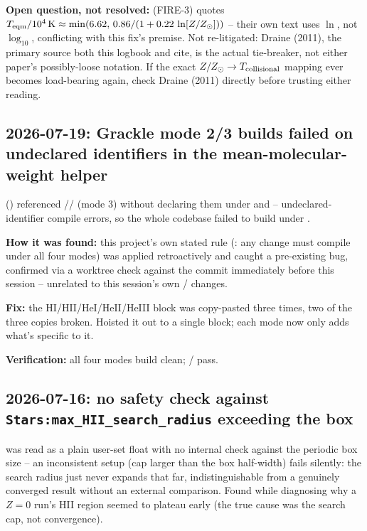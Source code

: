 \textbf{Open question, not resolved:} \citet{Hopkins2023} (FIRE-3)
quotes $T_{\rm eqm}/10^4\,{\rm K}\approx\min(6.62,\,
0.86/(1+0.22\,\ln[Z/Z_\odot]))$ -- their own text uses $\ln$, not
$\log_{10}$, conflicting with this fix's premise. Not re-litigated:
Draine (2011), the primary source both this logbook and
\citet{Hopkins2023} cite, is the actual tie-breaker, not either paper's
possibly-loose notation. If the exact $Z/Z_\odot\to T_{\rm collisional}$
mapping ever becomes load-bearing again, check Draine (2011) directly
before trusting either reading.

\subsection{2026-07-19: Grackle mode 2/3 builds failed on undeclared
identifiers in the mean-molecular-weight helper}
\label{sec:t15-grackle-modes}

 ()
referenced // (mode 3) without
declaring them under  and  -- undeclared-identifier compile errors, so the whole codebase
failed to build under .

\textbf{How it was found:} this project's own stated rule (:
any  change must compile under all four
modes) was applied retroactively and caught a pre-existing bug,
confirmed via a worktree check against the commit immediately before
this session -- unrelated to this session's own /
 changes.

\textbf{Fix:} the HI/HII/HeI/HeII/HeIII block was copy-pasted three
times, two of the three copies broken. Hoisted it out to a single
 block; each mode now only adds what's
specific to it.

\textbf{Verification:} all four modes build clean;
/
pass.

\subsection{2026-07-16: no safety check against
\texttt{Stars:max\_HII\_search\_radius} exceeding the box}
\label{sec:t6-boxsize-warning}

 was read as a plain user-set
float with no internal check against the periodic box size -- an
inconsistent setup (cap larger than the box half-width) fails silently:
the search radius just never expands that far, indistinguishable from
a genuinely converged result without an external comparison. Found
while diagnosing why a $Z=0$ run's HII region seemed to plateau early
(the true cause was the search cap, not convergence).

